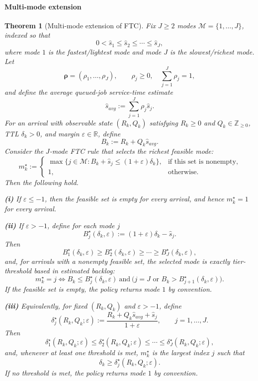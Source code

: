 \documentclass[fleqn,12pt,lineno]{wlpeerj}
\newtheorem{theorem}{Theorem}[section]
\begin{document}
\paragraph{Multi-mode extension}
\label{sec:ftc_multimode}

\begin{theorem}[Multi-mode extension of FTC]
\label{thm:ftc_multimode}
Fix $J \ge 2$ modes $\mathcal{M}=\{1,\dots,J\}$, indexed so that
\[
0 < \hat{s}_1 \le \hat{s}_2 \le \cdots \le \hat{s}_J,
\]
where mode $1$ is the fastest/lightest mode and mode $J$ is the
slowest/richest mode. Let
\[
\boldsymbol{\rho}=(\rho_1,\dots,\rho_J), \qquad \rho_j \ge 0,\quad
\sum_{j=1}^J \rho_j = 1,
\]
and define the average queued-job service-time estimate
\[
\hat{s}_{avg} := \sum_{j=1}^J \rho_j \hat{s}_j.
\]
For an arrival with observable state $(R_k,Q_k)$ satisfying $R_k \ge 0$ and
$Q_k \in \mathbb{Z}_{\ge 0}$, TTL $\delta_k > 0$, and margin $\varepsilon \in \mathbb{R}$, define
\[
B_k := R_k + Q_k \hat{s}_{avg}.
\]
Consider the $J$-mode FTC rule that selects the richest feasible mode:
\[
m_k^\star :=
\begin{cases}
\max\{j \in \mathcal{M} : B_k + \hat{s}_j \le (1+\varepsilon)\delta_k\},
& \text{if this set is nonempty},\\[1mm]
1, & \text{otherwise}.
\end{cases}
\]
Then the following hold.

\noindent\textbf{(i)} If $\varepsilon \le -1$, then the feasible set is empty for every arrival,
and hence $m_k^\star = 1$ for every arrival.

\noindent\textbf{(ii)} If $\varepsilon > -1$, define for each mode $j$
\[
B_j^\star(\delta_k,\varepsilon) := (1+\varepsilon)\delta_k - \hat{s}_j.
\]
Then
\[
B_1^\star(\delta_k,\varepsilon) \ge B_2^\star(\delta_k,\varepsilon) \ge \cdots
\ge B_J^\star(\delta_k,\varepsilon),
\]
and, for arrivals with a nonempty feasible set, the selected mode is exactly
tier-threshold based in estimated backlog:
\[
m_k^\star = j
\iff
B_k \le B_j^\star(\delta_k,\varepsilon)
\ \text{and}\
\bigl(j=J \text{ or } B_k > B_{j+1}^\star(\delta_k,\varepsilon)\bigr).
\]
If the feasible set is empty, the policy returns mode $1$ by convention.

\noindent\textbf{(iii)} Equivalently, for fixed $(R_k,Q_k)$ and $\varepsilon > -1$, define
\[
\delta_j^\star(R_k,Q_k;\varepsilon)
:=
\frac{R_k + Q_k \hat{s}_{avg} + \hat{s}_j}{1+\varepsilon},
\qquad j=1,\dots,J.
\]
Then
\[
\delta_1^\star(R_k,Q_k;\varepsilon)
\le
\delta_2^\star(R_k,Q_k;\varepsilon)
\le \cdots \le
\delta_J^\star(R_k,Q_k;\varepsilon),
\]
and, whenever at least one threshold is met, $m_k^\star$ is the largest index
$j$ such that
\[
\delta_k \ge \delta_j^\star(R_k,Q_k;\varepsilon).
\]
If no threshold is met, the policy returns mode $1$ by convention.


\end{theorem}
\end{document}
